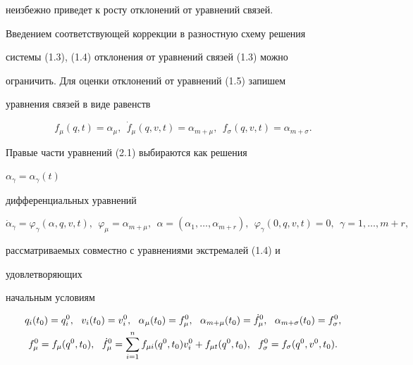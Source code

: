 неизбежно приведет к росту отклонений от уравнений связей. 


Введением соответствующей коррекции в разностную схему решения 


системы (1.3), (1.4) отклонения от уравнений связей (1.3) можно 


ограничить. Для оценки отклонений от уравнений (1.5) запишем 


уравнения связей в виде равенств 


\begin{equation} 


f_\mu(q,t)=\alpha_\mu,\ \ \Dot f_\mu(q,v,t)=\alpha_{m+\mu}, 


\ \ f_\sigma(q,v,t)=\alpha_{m+\sigma}. 


\end{equation} 


Правые части уравнений (2.1) выбираются как решения 


$\alpha_\gamma=\alpha_\gamma(t)$ 


дифференциальных уравнений 


\begin{equation} 


\Dot\alpha_\gamma=\varphi_\gamma(\alpha,q,v,t), 


\ \ \varphi_\mu=\alpha_{m+\mu}, 


\ \ \alpha=(\alpha_1,\dotsc,\alpha_{m+r}), 


\ \ \varphi_\gamma(0,q,v,t)=0,\ \ \gamma=1,\dotsc,m+r, 


\end{equation} 


рассматриваемых совместно с уравнениями экстремалей (1.4) и 


удовлетворяющих 


начальным условиям 


\begin{gather} 


q_i(t_0)=q^0_i,\ \ v_i(t_0)=v^0_i, 


\ \ \alpha_\mu(t_0)=f^0_\mu,\ \ \alpha_{m+\mu}(t_0)=\Dot f^0_\mu, 


\ \ \alpha_{m+\sigma}(t_0)=f^0_\sigma,\\ 


% 


f^0_\mu=f_\mu(q^0,t_0),\ \ \Dot f^0_\mu=\sum^n_{i=1} 


f_{\mu i}(q^0,t_0)v^0_i+f_{\mu t}(q^0,t_0), 


\ \ f^0_\sigma=f_\sigma(q^0,v^0,t_0). \notag


\end{gather} 


